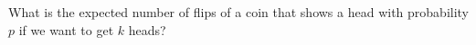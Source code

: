   What is the expected number of flips of a coin that
  shows a head with probability $p$ if we want to get $k$ heads?

